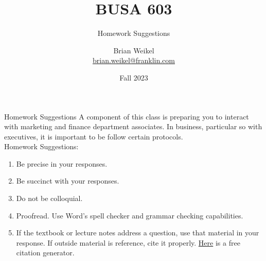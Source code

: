 \documentclass[pdf]{beamer}
\title{BUSA 603}
\subtitle{Homework Suggestions}
\theoremstyle{remark}
\theoremstyle{definition}
\begin{document}
\author[B. Weikel, Franklin University]{
	\begin{tabular}{c} 
	\Large
	Brian Weikel\\
    \footnotesize \href{mailto:brian.weikel@franklin.edu}{brian.weikel@franklin.com}
    \vspace{1ex}
\end{tabular}
\vspace{-4ex}}


\date{Fall 2023}%

\begin{noheadline}
\begin{frame}[t]\maketitle\end{frame}
\end{noheadline}

\begin{frame}[t]{Homework Suggestions}
A component of this class is preparing you to interact with marketing and finance department associates.  In business, particular so with executives, it is important to be follow certain protocols. \\
\vspace{1.5ex}
Homework Suggestions: \\
\small
\vspace{0.0ex}
\begin{enumerate}
\item Be precise in your responses.
\item Be succinct with your responses.
\item Do not be colloquial.
\item Proofread.  Use Word's spell checker and grammar checking capabilities.
\item If the textbook or lecture notes address a question, use that material in your response.  If outside material is reference, cite it properly. \href{https://www.grammarly.com/citations?utm_source=bing&utm_medium=cpc&utm_campaign=bts2022-citations-ps-cg&&msclkid=80af7d39f30d16d625521ece98354313&gclid=80af7d39f30d16d625521ece98354313&gclsrc=3p.ds}{Here} is a free citation generator.
\end{enumerate}
\end{frame}
\end{document}
